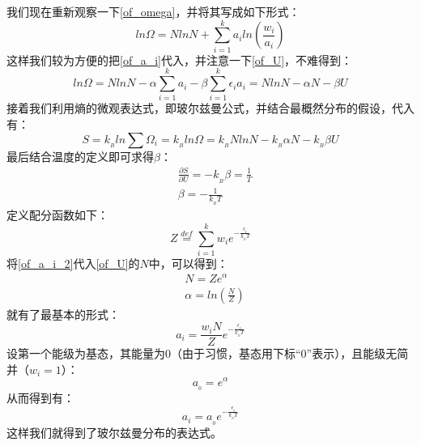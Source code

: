 \documentclass{Physics_H_Notes}
\begin{document}
\begin{prove}
            我们现在重新观察一下\ref{of_omega}，并将其写成如下形式：
            \begin{equation}
                ln\Omega = NlnN + \sum_{i = 1}^{k} a_i ln(\frac{w_i}{a_i})
            \end{equation}
            这样我们较为方便的把\ref{of_a_i}代入，并注意一下\ref{of_U}，不难得到：
            \begin{equation}
                ln\Omega = NlnN - \alpha \sum_{i = 1}^{k} a_i -\beta \sum_{i = 1}^{k}\epsilon_i a_i = NlnN -\alpha N - \beta U  
            \end{equation}
            接着我们利用熵的微观表达式，即玻尔兹曼公式，并结合最概然分布的假设，代入有：
            \begin{equation}
                S = k_{_B}ln\sum \Omega_i = k_{_B}ln\Omega =  k_{_B}NlnN -k_{_B}\alpha N - k_{_B}\beta U
                \label{of_S}
            \end{equation}
            最后结合温度的定义即可求得$\beta$：
            \begin{equation}
                \begin{aligned}
                    &\frac{\partial S}{\partial U} = -k_{_B}\beta =\frac{1}{T}\\
                    &\beta = -\frac{1}{k_{_B}T}
                \end{aligned}
            \end{equation}
            定义配分函数如下：
            \begin{equation}
                Z \overset{def}{=} \sum_{i=1}^{k}w_i e^{-\frac{\epsilon_i}{k_{_B}T}}
            \end{equation}
            将\ref{of_a_i_2}代入\ref{of_U}的$N$中，可以得到：
            \begin{equation}
                \begin{aligned}
                    &N = Ze^{\alpha} \\
                    &\alpha = ln\left(\frac{N}{Z}\right)
                \end{aligned}
            \end{equation}
            就有了最基本的形式：
            \begin{equation}
                a_i = \frac{w_{i}N}{Z} e^{-\frac{\epsilon_i}{k_{_B}T}}
                \label{of_a_i_3}
            \end{equation}
            设第一个能级为基态，其能量为0（由于习惯，基态用下标“0”表示），且能级无简并（$w_i=1$）：
            \begin{equation}
                a_{_0} = e^{\alpha}
            \end{equation}
            从而得到有：
            \begin{equation}
                a_i = a_{_0} e^{-\frac{\epsilon_i}{k_{_B}T}} 
            \end{equation}
            这样我们就得到了玻尔兹曼分布的表达式。
        \end{prove}
\end{document}
